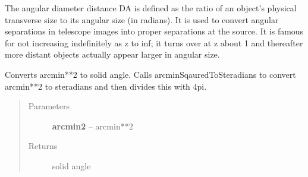 \documentclass[letterpaper,10pt,english]{sphinxmanual}
\begin{document}

\begin{fulllineitems}
\label{SamPy.astronomy:SamPy.astronomy.conversions.angularDiameterDistance}
The angular diameter distance DA is defined as the ratio of
an object's physical transverse size to its angular size
(in radians). It is used to convert angular separations in
telescope images into proper separations at the source. It
is famous for not increasing indefinitely as z to inf; it turns
over at z about 1 and thereafter more distant objects actually
appear larger in angular size.

\end{fulllineitems}



\begin{fulllineitems}
\label{SamPy.astronomy:SamPy.astronomy.conversions.arccot}
\end{fulllineitems}



\begin{fulllineitems}
\label{SamPy.astronomy:SamPy.astronomy.conversions.arcminSquaredToSolidAnge}
Converts arcmin**2 to solid angle.
Calls arcminSqauredToSteradians to
convert arcmin**2 to steradians and
then divides this with 4pi.
\begin{quote}\begin{description}
\item[{Parameters}] \leavevmode
\textbf{arcmin2} -- arcmin**2

\item[{Returns}] \leavevmode
solid angle

\end{description}\end{quote}

\end{fulllineitems}


\end{document}
